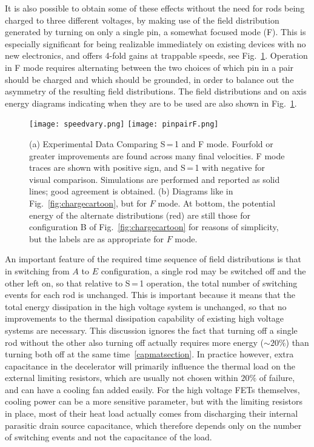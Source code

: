 It is also possible to obtain some of these effects without the need for rods being charged to three different voltages, by making use of the field distribution generated by turning on only a single pin, a somewhat focused mode (F).
This is especially significant for being realizable immediately on existing devices with no new electronics, and offers 4-fold gains at trappable speeds, see Fig.~\ref{fig:speedvary}.
Operation in F mode requires alternating between the two choices of which pin in a pair should be charged and which should be grounded, in order to balance out the asymmetry of the resulting field distributions.
The field distributions and on axis energy diagrams indicating when they are to be used are also shown in Fig.~\ref{fig:speedvary}.

\begin{figure}[t!]
\centering
\texttt{[image: speedvary.png]}\hspace{4mm}
\texttt{[image: pinpairF.png]}%
\caption[S\,=\,1 and F Mode Comparison]{\label{fig:speedvary}
(a) Experimental Data Comparing S\,=\,1 and F mode. Fourfold or greater improvements are found across many final velocities. F mode traces are shown with positive sign, and S\,=\,1 with negative for visual comparison. Simulations are performed and reported as solid lines; good agreement is obtained.
(b) Diagrams like in Fig.~\ref{fig:chargecartoon}, but for $F$ mode. At bottom, the potential energy of the alternate distributions (red) are still those for configuration B of Fig.~\ref{fig:chargecartoon} for reasons of simplicity, but the labels are as appropriate for $F$ mode.
}
\end{figure}

An important feature of the required time sequence of field distributions is that in switching from $A$ to $E$ configuration, a single rod may be switched off and the other left on, so that relative to S\,=\,1 operation, the total number of switching events for each rod is unchanged.
This is important because it means that the total energy dissipation in the high voltage system is unchanged, so that no improvements to the thermal dissipation capability of existing high voltage systems are necessary.
This discussion ignores the fact that turning off a single rod without the other also turning off actually requires more energy ($\sim 20\%$) than turning both off at the same time~\ref{capmatsection}. 
In practice however, extra capacitance in the decelerator will primarily influence the thermal load on the external limiting resistors, which are usually not chosen within $20\%$ of failure, and can have a cooling fan added easily.
For the high voltage FETs themselves, cooling power can be a more sensitive parameter, but with the limiting resistors in place, most of their heat load actually comes from discharging their internal parasitic drain source capacitance, which therefore depends only on the number of switching events and not the capacitance of the load.


